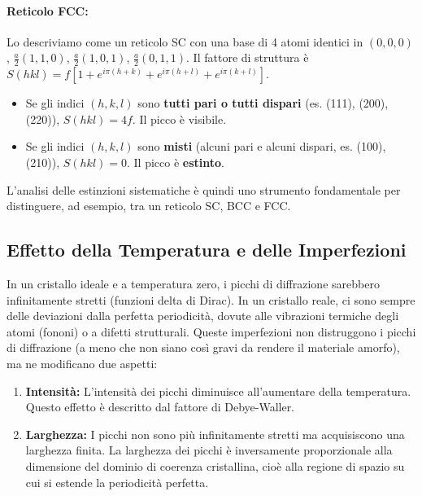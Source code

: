 \paragraph{Reticolo FCC:} Lo descriviamo come un reticolo SC con una base di 4 atomi identici in $(0,0,0)$, $\frac{a}{2}(1,1,0)$, $\frac{a}{2}(1,0,1)$, $\frac{a}{2}(0,1,1)$. Il fattore di struttura è $S(hkl) = f[1 + e^{i\pi(h+k)} + e^{i\pi(h+l)} + e^{i\pi(k+l)}]$.
\begin{itemize}
    \item Se gli indici $(h,k,l)$ sono \textbf{tutti pari o tutti dispari} (es. (111), (200), (220)), $S(hkl) = 4f$. Il picco è visibile.
    \item Se gli indici $(h,k,l)$ sono \textbf{misti} (alcuni pari e alcuni dispari, es. (100), (210)), $S(hkl) = 0$. Il picco è \textbf{estinto}.
\end{itemize}
L'analisi delle estinzioni sistematiche è quindi uno strumento fondamentale per distinguere, ad esempio, tra un reticolo SC, BCC e FCC.

\subsection{Effetto della Temperatura e delle Imperfezioni}
In un cristallo ideale e a temperatura zero, i picchi di diffrazione sarebbero infinitamente stretti (funzioni delta di Dirac). In un cristallo reale, ci sono sempre delle deviazioni dalla perfetta periodicità, dovute alle vibrazioni termiche degli atomi (fononi) o a difetti strutturali. Queste imperfezioni non distruggono i picchi di diffrazione (a meno che non siano così gravi da rendere il materiale amorfo), ma ne modificano due aspetti:
\begin{enumerate}
    \item \textbf{Intensità:} L'intensità dei picchi diminuisce all'aumentare della temperatura. Questo effetto è descritto dal fattore di Debye-Waller.
    \item \textbf{Larghezza:} I picchi non sono più infinitamente stretti ma acquisiscono una larghezza finita. La larghezza dei picchi è inversamente proporzionale alla dimensione del dominio di coerenza cristallina, cioè alla regione di spazio su cui si estende la periodicità perfetta.
\end{enumerate}